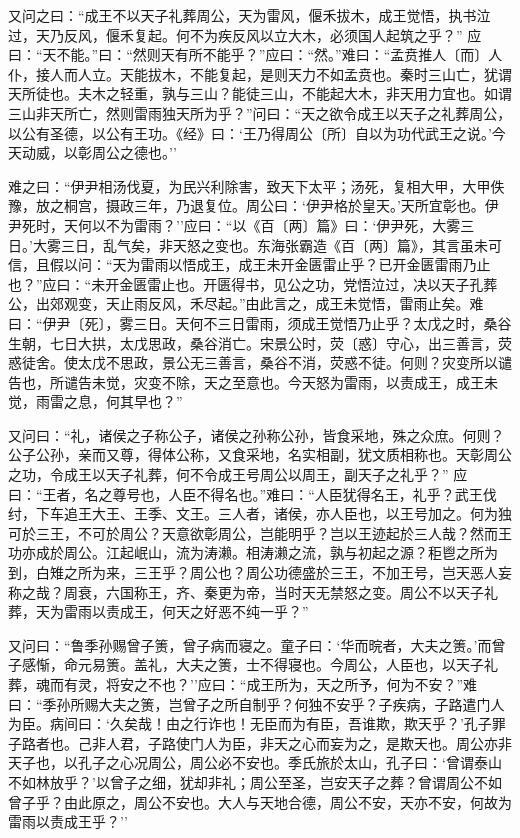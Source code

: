 \documentclass[]{article}
\begin{document}
又问之曰：``成王不以天子礼葬周公，天为雷风，偃禾拔木，成王觉悟，执书泣过，天乃反风，偃禾复起。何不为疾反风以立大木，必须国人起筑之乎？''
应曰：``天不能。''曰：``然则天有所不能乎？''应曰：``然。''难曰：``孟贲推人〔而〕人仆，接人而人立。天能拔木，不能复起，是则天力不如孟贲也。秦时三山亡，犹谓天所徒也。夫木之轻重，孰与三山？能徒三山，不能起大木，非天用力宜也。如谓三山非天所亡，然则雷雨独天所为乎？''问曰：``天之欲令成王以天子之礼葬周公，以公有圣德，以公有王功。《经》曰：`王乃得周公〔所〕自以为功代武王之说。'今天动威，以彰周公之德也。''

难之曰：``伊尹相汤伐夏，为民兴利除害，致天下太平；汤死，复相大甲，大甲佚豫，放之桐宫，摄政三年，乃退复位。周公曰：`伊尹格於皇天。'天所宜彰也。伊尹死时，天何以不为雷雨？''应曰：``以《百〔两〕篇》曰：`伊尹死，大雾三日。'大雾三日，乱气矣，非天怒之变也。东海张霸造《百〔两〕篇》，其言虽未可信，且假以问：``天为雷雨以悟成王，成王未开金匮雷止乎？已开金匮雷雨乃止也？''应曰：``未开金匮雷止也。开匮得书，见公之功，党悟泣过，决以天子孔葬公，出郊观变，天止雨反风，禾尽起。''由此言之，成王未觉悟，雷雨止矣。难曰：``伊尹〔死〕，雾三日。天何不三日雷雨，须成王觉悟乃止乎？太戊之时，桑谷生朝，七日大拱，太戊思政，桑谷消亡。宋景公时，荧〔惑〕守心，出三善言，荧惑徒舍。使太戊不思政，景公无三善言，桑谷不消，荧惑不徒。何则？灾变所以谴告也，所谴告未觉，灾变不除，天之至意也。今天怒为雷雨，以责成王，成王未觉，雨雷之息，何其早也？''

又问曰：``礼，诸侯之子称公子，诸侯之孙称公孙，皆食采地，殊之众庶。何则？公子公孙，亲而又尊，得体公称，又食采地，名实相副，犹文质相称也。天彰周公之功，令成王以天子礼葬，何不令成王号周公以周王，副天子之礼乎？''
应曰：``王者，名之尊号也，人臣不得名也。''难曰：``人臣犹得名王，礼乎？武王伐纣，下车追王大王、王季、文王。三人者，诸侯，亦人臣也，以王号加之。何为独可於三王，不可於周公？天意欲彰周公，岂能明乎？岂以王迹起於三人哉？然而王功亦成於周公。江起岷山，流为涛濑。相涛濑之流，孰与初起之源？秬鬯之所为到，白雉之所为来，三王乎？周公也？周公功德盛於三王，不加王号，岂天恶人妄称之哉？周衰，六国称王，齐、秦更为帝，当时天无禁怒之变。周公不以天子礼葬，天为雷雨以责成王，何天之好恶不纯一乎？''

又问曰：``鲁季孙赐曾子箦，曾子病而寝之。童子曰：`华而晥者，大夫之箦。'而曾子感惭，命元易箦。盖礼，大夫之箦，士不得寝也。今周公，人臣也，以天子礼葬，魂而有灵，将安之不也？''应曰：``成王所为，天之所予，何为不安？''难曰：``季孙所赐大夫之箦，岂曾子之所自制乎？何独不安乎？子疾病，子路遣门人为臣。病间曰：`久矣哉！由之行诈也！无臣而为有臣，吾谁欺，欺天乎？'孔子罪子路者也。己非人君，子路使门人为臣，非天之心而妄为之，是欺天也。周公亦非天子也，以孔子之心况周公，周公必不安也。季氏旅於太山，孔子曰：`曾谓泰山不如林放乎？'以曾子之细，犹却非礼；周公至圣，岂安天子之葬？曾谓周公不如曾子乎？由此原之，周公不安也。大人与天地合德，周公不安，天亦不安，何故为雷雨以责成王乎？''
\end{document}
